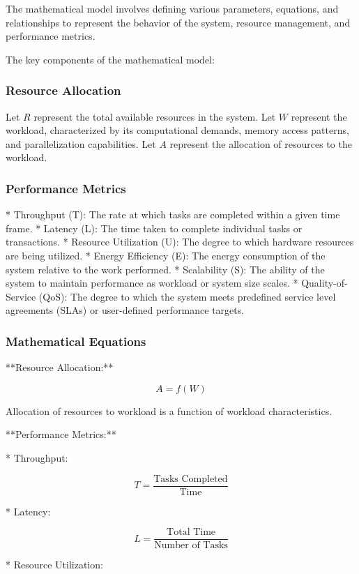 \documentclass[16pt,a4paper]{article}
\begin{document}
The mathematical model involves defining various parameters, equations, and relationships to represent the behavior of the system, resource management, and performance metrics.

The key components of the mathematical model:

\subsubsection{Resource Allocation}

Let $R$ represent the total available resources in the system.  Let $W$ represent the workload, characterized by its computational demands, memory access patterns, and parallelization capabilities.  Let $A$ represent the allocation of resources to the workload.

\subsubsection{Performance Metrics}

* Throughput (T): The rate at which tasks are completed within a given time frame.
* Latency (L): The time taken to complete individual tasks or transactions.
* Resource Utilization (U): The degree to which hardware resources are being utilized.
* Energy Efficiency (E): The energy consumption of the system relative to the work performed.
* Scalability (S): The ability of the system to maintain performance as workload or system size scales.
* Quality-of-Service (QoS): The degree to which the system meets predefined service level agreements (SLAs) or user-defined performance targets.

\subsubsection{Mathematical Equations}

**Resource Allocation:**

$$A=f(W)$$

Allocation of resources to workload is a function of workload characteristics.

**Performance Metrics:**

* Throughput:

$$T= \frac{\text{Tasks Completed}}{\text{Time}}$$

* Latency:

$$L = \frac{\text{Total Time}}{\text{Number of Tasks}}$$

* Resource Utilization:
\end{document}
